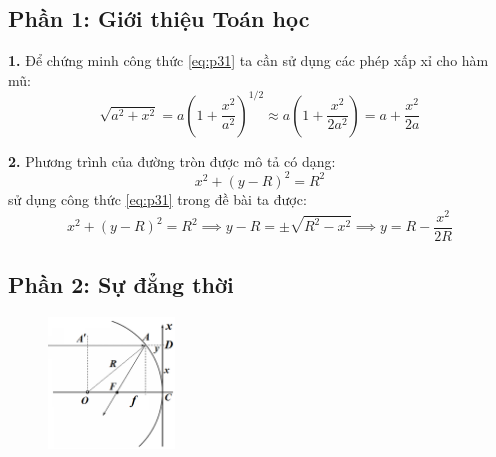 \subsection*{Phần 1: Giới thiệu Toán học}
\noindent\textbf{1.} Để chứng minh công thức \eqref{eq:p31} ta cần sử dụng các phép xấp xỉ cho hàm mũ:
\begin{equation}
  \label{eq:31}
  \sqrt{a^{2} + x^{2}} = a \left( 1 + \frac{x^{2}}{a^{2}} \right)^{1/2} \approx a \left( 1 + \frac{x^{2}}{2a^{2}} \right) = a + \frac{x^{2}}{2a}
\end{equation}

\noindent\textbf{2.} Phương trình của đường tròn được mô tả có dạng:
\begin{equation}
  \label{eq:32}
  x^{2} + (y - R)^{2} = R^{2}
\end{equation}
sử dụng công thức \eqref{eq:p31} trong đề bài ta được:
\begin{equation}
  \label{eq:33}
  x^{2} + (y - R)^{2} = R^{2} \implies y - R = \pm \sqrt{R^{2} - x^{2}} \implies y = R - \frac{x^{2}}{2R}
\end{equation}

\subsection*{Phần 2: Sự đẳng thời}
\begin{figure}
  \centering
  \vspace{-4mm}
  \includegraphics[width=0.3\textwidth]{Figures/P3/Fig 3.1S.png}
\end{figure}

